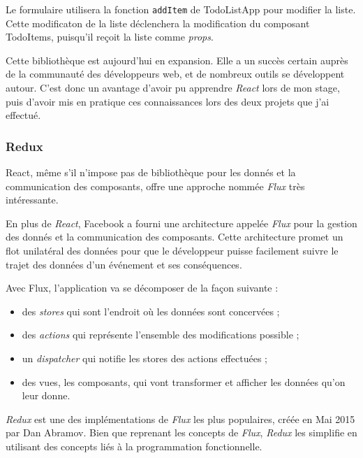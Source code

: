 Le formulaire utilisera la fonction \texttt{addItem} de TodoListApp pour
modifier la liste. Cette modificaton de la liste déclenchera la
modification du composant TodoItems, puisqu'il reçoit la liste comme
\emph{props}.

\bigskip

Cette bibliothèque est aujourd'hui en expansion. Elle a un succès
certain auprès de la communauté des développeurs web, et de nombreux
outils se développent autour. C'est donc un avantage d'avoir pu
apprendre \emph{React} lors de mon stage, puis d'avoir mis en pratique
ces connaissances lors des deux projets que j'ai effectué.

\bigskip

\subsubsection{Redux}\label{redux}

\bigskip

React, même s'il n'impose pas de bibliothèque pour les donnés et la
communication des composants, offre une approche nommée \emph{Flux} très
intéressante.

\bigskip

En plus de \emph{React}, Facebook a fourni une architecture appelée
\emph{Flux} pour la gestion des donnés et la communication des
composants. Cette architecture promet un flot unilatéral des données
pour que le développeur puisse facilement suivre le trajet des données
d'un événement et ses conséquences.

\bigskip

Avec Flux, l'application va se décomposer de la façon suivante :

\begin{itemize}
\tightlist
\item
  des \emph{stores} qui sont l'endroit où les données sont concervées ;
\item
  des \emph{actions} qui représente l'ensemble des modifications
  possible ;
\item
  un \emph{dispatcher} qui notifie les stores des actions effectuées ;
\item
  des vues, les composants, qui vont transformer et afficher les données
  qu'on leur donne.
\end{itemize}

\bigskip

\emph{Redux} est une des implémentations de \emph{Flux} les plus
populaires, créée en Mai 2015 par Dan Abramov. Bien que reprenant les
concepts de \emph{Flux}, \emph{Redux} les simplifie en utilisant des
concepts liés à la programmation fonctionnelle.

